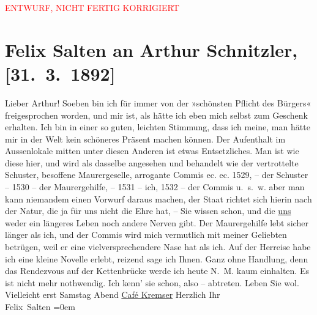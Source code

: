 
\begin{center}
            \textcolor{red}{ENTWURF, NICHT FERTIG KORRIGIERT}
                      \end{center}
            
         \renewcommand{\erwaehnteOrte}{Orte: Café Kremser, Wien}
         \renewcommand{\erwaehnteWerke}{}
               \section[Felix Salten an Arthur Schnitzler, {[}31. 3. 1892{]}]{ Felix Salten an Arthur Schnitzler, {[}31. 3. 1892{]}}\nopagebreak{}\rehead{ }\begin{ledgroupsized}[t]{13cm}\normalsize\beginnumbering \toendnotes[C]{\smallbreak\pagebreak[2]} 
\pstart
           \noindent{}{\pb}Lieber Arthur! Soeben bin ich für immer von der »schönsten Pflicht
               des Bürgers« freigesprochen worden, und mir ist, als hätte ich eben mich selbst zum
               Geschenk erhalten. Ich bin in einer so guten, leichten Stimmung, dass ich meine, man
               hätte mir in der Welt kein schöneres Präsent machen können. Der Aufenthalt {\pb}im Aussenlokale mitten
               unter diesen Anderen ist etwas Entsetzliches. Man ist wie diese hier, und wird als
               dasselbe angesehen und behandelt wie der vertrottelte Schuster, besoffene
               Maurergeselle, arrogante Commis ec. ec. 1529, – der Schuster – 1530 – der
               Maurergehilfe, – 1531 – ich, 1532 – der Commis u. s. w. aber man kann niemandem einen
               Vorwurf daraus machen, der Staat richtet {\pb}sich hierin nach der
               Natur, die ja für uns nicht die Ehre hat, – Sie wissen schon, und die \uline{uns} weder ein längeres Leben noch andere Nerven gibt.
               Der Maurergehilfe lebt sicher länger als ich, und der Commis wird mich vermutlich mit
               meiner Geliebten betrügen, weil er eine vielversprechendere Nase hat als ich. Auf der
               Herreise habe ich eine kleine Novelle erlebt, reizend sage {\pb}ich Ihnen. Ganz ohne Handlung,
               denn das Rendezvous auf der Kettenbrücke werde ich heute N. M. kaum einhalten. Es ist
               nicht mehr nothwendig. Ich kenn’ sie schon, also – abtreten.\pend
           \pstart
           Leben Sie wol. Vielleicht erst Samstag{ }Abend{ }\uline{Café Kremser}\pend
           \pstart
           Herzlich Ihr {\\[\baselineskip]}\spacefill\mbox{Felix Salten}\pend
           \leftskip=0em{}
         

\end{ledgroupsized}
